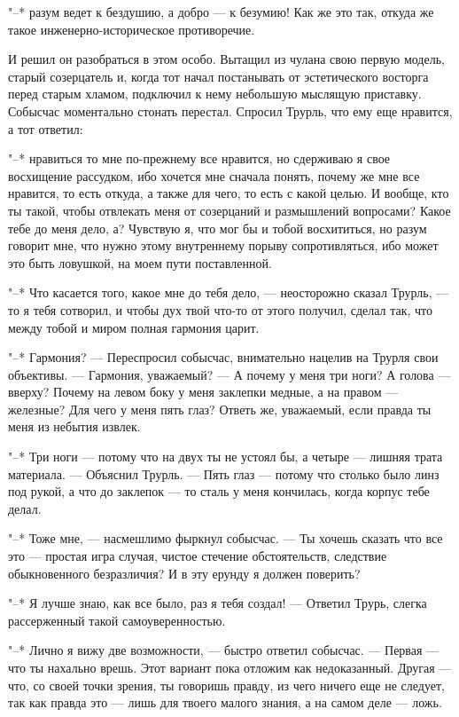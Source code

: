 "--* разум ведет к бездушию, а добро --- к безумию! Как же
это так, откуда же такое инженерно-историческое
противоречие.

И решил он разобраться в этом особо. Вытащил из чулана
свою первую модель, старый созерцатель и, когда тот начал
постанывать от эстетического восторга перед старым хламом,
подключил к нему небольшую мыслящую приставку. Собысчас
моментально стонать перестал. Спросил Трурль, что ему еще
нравится, а тот ответил:

"--* нравиться то мне по-прежнему все нравится, но
сдерживаю я свое восхищение рассудком, ибо хочется мне
сначала понять, почему же мне все нравится, то есть откуда,
а также для чего, то есть с какой целью. И вообще, кто ты
такой, чтобы отвлекать меня от созерцаний и размышлений
вопросами? Какое тебе до меня дело, а? Чувствую я, что мог
бы и тобой восхититься, но разум говорит мне, что нужно
этому внутреннему порыву сопротивляться, ибо может это быть
ловушкой, на моем пути поставленной.

"--* Что касается того, какое мне до тебя дело, --- неосторожно
сказал Трурль, --- то я тебя сотворил, и чтобы
дух твой что-то от этого получил, сделал так, что между
тобой и миром полная гармония царит.

"--* Гармония? --- Переспросил собысчас, внимательно нацелив
на Трурля свои объективы. --- Гармония, уважаемый? --- А
почему у меня три ноги? А голова --- вверху? Почему на левом
боку у меня заклепки медные, а на правом --- железные? Для
чего у меня пять глаз? Ответь же, уважаемый, если правда ты
меня из небытия извлек.

"--* Три ноги --- потому что на двух ты не устоял бы, а
четыре --- лишняя трата материала. --- Объяснил Трурль. --- Пять
глаз --- потому что столько было линз под рукой, а что до
заклепок --- то сталь у меня кончилась, когда корпус тебе
делал.

"--* Тоже мне, --- насмешлимо фыркнул собысчас. --- Ты хочешь
сказать что все это --- простая игра случая, чистое стечение
обстоятельств, следствие обыкновенного безразличия? И в эту
ерунду я должен поверить?

"--* Я лучше знаю, как все было, раз я тебя создал! --- Ответил
Трурь, слегка рассерженный такой самоуверенностью.

"--* Лично я вижу две возможности, --- быстро ответил
собысчас. --- Первая --- что ты нахально врешь. Этот вариант
пока отложим как недоказанный. Другая --- что, со своей точки
зрения, ты говоришь правду, из чего ничего еще не следует,
так как правда это --- лишь для твоего малого знания, а на
самом деле --- ложь.

